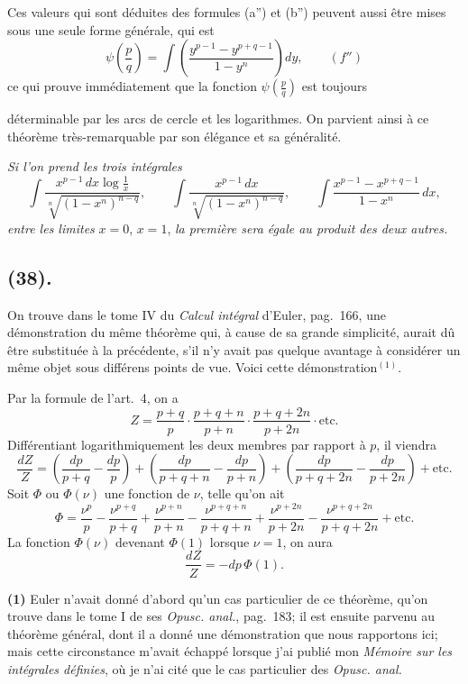\documentclass{article}
\begin{document}
Ces valeurs qui sont déduites des formules (a'') et (b'') peuvent aussi être mises sous une seule forme générale, qui est
\[ \psi\left(\frac{p}{q}\right)=\int\left(\frac{y^{p-1}-y^{p+q-1}}{1-y^{n}}\right)dy,\qquad(f'') \]
ce qui prouve immédiatement que la fonction $\psi\left(\frac{p}{q}\right)$ est toujours

déterminable par les arcs de cercle et les logarithmes. On parvient ainsi à ce théorème très-remarquable par son élégance et sa généralité.

\emph{Si l'on prend les trois intégrales}
\[ \int\frac{x^{p-1}\,dx\log\frac{1}{x}}{\sqrt[n]{(1-x^{n})^{n-q}}},\qquad\int\frac{x^{p-1}\,dx}{\sqrt[n]{(1-x^{n})^{n-q}}},\qquad\int\frac{x^{p-1}-x^{p+q-1}}{1-x^{n}}\,dx, \]
\emph{entre les limites} $x=0$, $x=1$, \emph{la première sera égale au produit des deux autres.}

\subsection*{(38).}

On trouve dans le tome IV du \emph{Calcul intégral} d'Euler, pag.~166, une démonstration du même théorème qui, à cause de sa grande simplicité, aurait dû être substituée à la précédente, s'il n'y avait pas quelque avantage à considérer un même objet sous différens points de vue. Voici cette démonstration${}^{(1)}$.

Par la formule de l'art.~4, on a
\[ Z=\frac{p+q}{p}\cdot\frac{p+q+n}{p+n}\cdot\frac{p+q+2n}{p+2n}\cdot\text{etc.} \]
Différentiant logarithmiquement les deux membres par rapport à $p$, il viendra
\[ \frac{dZ}{Z}=\left(\frac{dp}{p+q}-\frac{dp}{p}\right)+\left(\frac{dp}{p+q+n}-\frac{dp}{p+n}\right)+\left(\frac{dp}{p+q+2n}-\frac{dp}{p+2n}\right)+\text{etc.} \]
Soit $\Phi$ ou $\Phi(\nu)$ une fonction de $\nu$, telle qu'on ait
\[ \Phi=\frac{\nu^{p}}{p}-\frac{\nu^{p+q}}{p+q}+\frac{\nu^{p+n}}{p+n}-\frac{\nu^{p+q+n}}{p+q+n}+\frac{\nu^{p+2n}}{p+2n}-\frac{\nu^{p+q+2n}}{p+q+2n}+\text{etc.} \]
La fonction $\Phi(\nu)$ devenant $\Phi(1)$ lorsque $\nu=1$, on aura
\[ \frac{dZ}{Z}=-dp\,\Phi(1). \]

\textbf{(1)} Euler n'avait donné d'abord qu'un cas particulier de ce théorème, qu'on trouve dans le tome I de ses \emph{Opusc. anal.}, pag.~183; il est ensuite parvenu au théorème général, dont il a donné une démonstration que nous rapportons ici; mais cette circonstance m'avait échappé lorsque j'ai publié mon \emph{Mémoire sur les intégrales définies}, où je n'ai cité que le cas particulier des \emph{Opusc. anal.}
\end{document}

